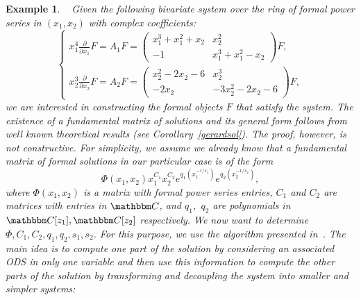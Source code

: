 \documentclass[final,1p,times,number,amsthm]{elsart}
\newtheorem{example}[lemma]{Example}
\let\set\mathbbm
\newcommand{\pder}[2]{\frac{\partial}{\partial #2}#1}
\begin{document}
\begin{example}~\cite[Example 2]{key101}
  \label{ex:sim}
  Given the following bivariate system over the ring of formal power series in
  $(x_1,x_2)$ with complex coefficients:
  \begin{equation*}
    \begin{cases}
      x_1^{4} \pder{F}{x_1} = A_1 F = \left(\begin{matrix}
          x_1^3 + x_1^2+x_2 & x_2^2 \\
          -1 & x_1^3 + x_1^2 -x_2
        \end{matrix}\right) F, \\
      x_2^3 \pder{F}{x_2} = A_2 F= \left(\begin{matrix}
          x_2^2 -2 x_2 -6 & x_2^3 \\
          -2 x_2 & -3 x_2^2 -2 x_2 -6
        \end{matrix}\right) F,
    \end{cases}
  \end{equation*}
  we are interested in constructing the formal objects $F$ that satisfy the
  system. The existence of a fundamental matrix of solutions and its general
  form follows from well known theoretical results (see
  Corollary~\ref{gerardsol}). The proof, however, is not constructive. For
  simplicity, we assume we already know that a fundamental matrix of formal
  solutions in our particular case is of the form
  \begin{equation} \label{sim:sol1} \Phi(x_1, x_2) x_1^{C_1}x_2^{C_2}
    e^{q_1(x_1^{- 1/s_1})} e^{q_2(x_2^{- 1/s_2})}, \end{equation} where
  $\Phi(x_1, x_2)$ is a matrix with formal power series entries, $C_1$ and $C_2$
  are matrices with entries in $\set C$, and $q_1$,~$q_2$ are polynomials in
  $\set C[z_1], \set C[z_2]$ respectively. We now want to determine
  $ \Phi, C_1, C_2, q_1, q_2,s_1,s_2$.  For this purpose, we use the algorithm
  presented in~\cite{key101}. The main idea is to compute one part
  of the solution by considering an associated ODS in only one variable and then
  use this information to compute the other parts of the solution by
  transforming and decoupling the system into smaller and simpler systems:


\end{example}
\end{document}

